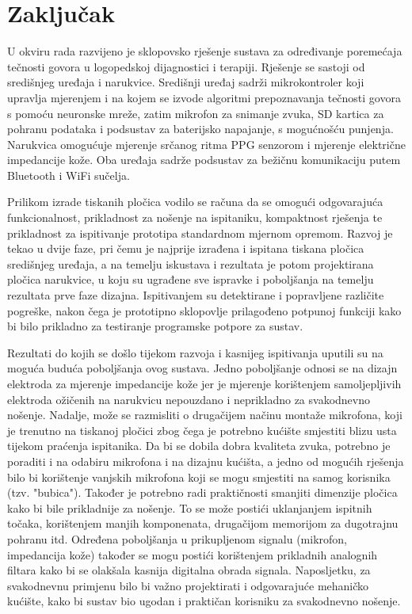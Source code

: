\chapter{Zaključak}
\label{pog:zakljucak}

U okviru rada razvijeno je sklopovsko rješenje sustava za određivanje poremećaja tečnosti govora u logopedskoj dijagnostici i terapiji. Rješenje se sastoji od središnjeg uređaja i narukvice. Središnji uređaj sadrži mikrokontroler koji upravlja mjerenjem i na kojem se izvode algoritmi prepoznavanja tečnosti govora s pomoću neuronske mreže, zatim mikrofon za snimanje zvuka, SD kartica za pohranu podataka i podsustav za baterijsko napajanje, s mogućnošću punjenja. Narukvica omogućuje mjerenje srčanog ritma PPG senzorom i mjerenje električne impedancije kože. Oba uređaja sadrže podsustav za bežičnu komunikaciju putem Bluetooth i WiFi sučelja.

Prilikom izrade tiskanih pločica vodilo se računa da se omogući odgovarajuća funkcionalnost, prikladnost za nošenje na ispitaniku, kompaktnost rješenja te prikladnost za ispitivanje prototipa standardnom mjernom opremom. Razvoj je tekao u dvije faze, pri čemu je najprije izrađena i ispitana tiskana pločica središnjeg uređaja, a na temelju iskustava i rezultata je potom projektirana pločica narukvice, u koju su ugrađene sve ispravke i poboljšanja na temelju rezultata prve faze dizajna. Ispitivanjem su detektirane i popravljene različite pogreške, nakon čega je prototipno sklopovlje prilagođeno potpunoj funkciji kako bi bilo prikladno za testiranje programske potpore za sustav. 

Rezultati do kojih se došlo tijekom razvoja i kasnijeg ispitivanja uputili su na moguća buduća poboljšanja ovog sustava. Jedno poboljšanje odnosi se na dizajn elektroda za mjerenje impedancije kože jer je mjerenje korištenjem samoljepljivih elektroda ožičenih na narukvicu nepouzdano i neprikladno za svakodnevno nošenje. Nadalje, može se razmisliti o drugačijem načinu montaže mikrofona, koji je trenutno na tiskanoj pločici zbog čega je potrebno kućište smjestiti blizu usta tijekom praćenja ispitanika. Da bi se dobila dobra kvaliteta zvuka, potrebno je poraditi i na odabiru mikrofona i na dizajnu kućišta, a jedno od mogućih rješenja bilo bi korištenje vanjskih mikrofona koji se mogu smjestiti na samog korisnika (tzv. "bubica"). Također je potrebno radi praktičnosti smanjiti dimenzije pločica kako bi bile prikladnije za nošenje. To se može postići uklanjanjem ispitnih točaka, korištenjem manjih komponenata, drugačijom memorijom za dugotrajnu pohranu itd. Određena poboljšanja u prikupljenom signalu (mikrofon, impedancija kože) također se mogu postići korištenjem prikladnih analognih filtara kako bi se olakšala kasnija digitalna obrada signala. Naposljetku, za svakodnevnu primjenu bilo bi važno projektirati i odgovarajuće mehaničko kućište, kako bi sustav bio ugodan i praktičan korisniku za svakodnevno nošenje.